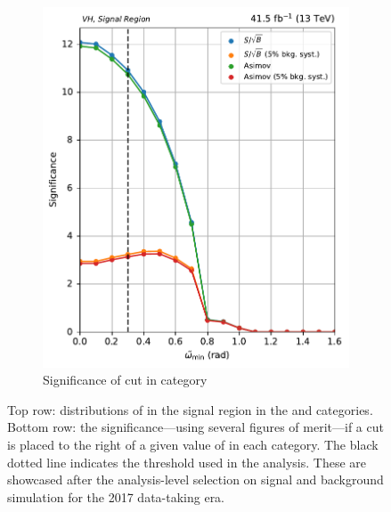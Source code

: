 \begin{figure}[htbp]
\begin{subfigure}[b]{0.35\textwidth}
        \includegraphics[width=\textwidth]{figures/category_optimisations/with_mindphi_cut/significance_VH_min_omega_tilde_all.pdf}
        \caption{Significance of cut in \VH category}
    \end{subfigure}
    \caption[Distributions of \omegaTilde in the signal region in the \ttH and \VH categories, along with the significance---using several figures of merit---if a cut is placed to the right of a given value]{Top row: distributions of \omegaTilde in the signal region in the \ttH and \VH categories. Bottom row: the significance---using several figures of merit---if a cut is placed to the right of a given value of \omegaTilde in each category. The black dotted line indicates the threshold used in the analysis. These are showcased after the analysis-level selection on signal and background simulation for the 2017 data-taking era.}
    \label{fig:htoinv_category_optimisations_significances}
\end{figure}


